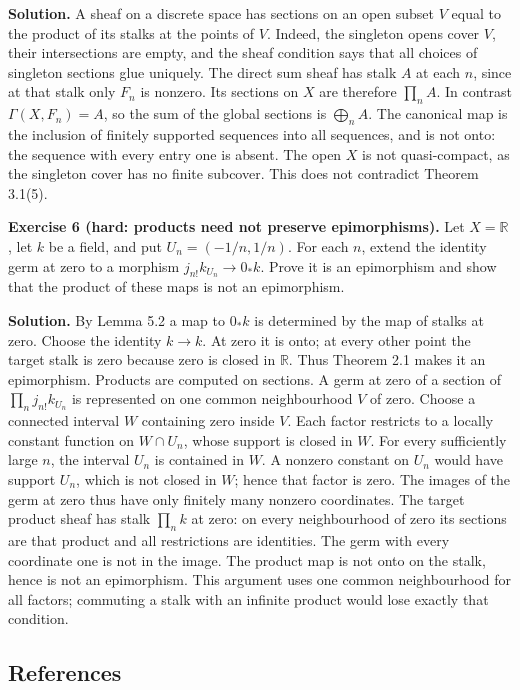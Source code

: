 \documentclass[
  english,
  11pt,
  a4paper,
]{article}
\begin{document}
\textbf{Solution.} A sheaf on a discrete space has sections on an open
subset \(V\) equal to the product of its stalks at the points of \(V\).
Indeed, the singleton opens cover \(V\), their intersections are empty,
and the sheaf condition says that all choices of singleton sections glue
uniquely. The direct sum sheaf has stalk \(A\) at each \(n\), since at
that stalk only \(F_n\) is nonzero. Its sections on \(X\) are therefore
\(\prod_nA\). In contrast \(\Gamma(X,F_n)=A\), so the sum of the global
sections is \(\bigoplus_nA\). The canonical map is the inclusion of
finitely supported sequences into all sequences, and is not onto: the
sequence with every entry one is absent. The open \(X\) is not
quasi-compact, as the singleton cover has no finite subcover. This does
not contradict Theorem 3.1(5).

\textbf{Exercise 6 (hard: products need not preserve epimorphisms).} Let
\(X=\mathbb R\), let \(k\) be a field, and put \(U_n=(-1/n,1/n)\). For
each \(n\), extend the identity germ at zero to a morphism
\(j_{n!}k_{U_n}\to0_*k\). Prove it is an epimorphism and show that the
product of these maps is not an epimorphism.

\textbf{Solution.} By Lemma 5.2 a map to \(0_*k\) is determined by the
map of stalks at zero. Choose the identity \(k\to k\). At zero it is
onto; at every other point the target stalk is zero because zero is
closed in \(\mathbb R\). Thus Theorem 2.1 makes it an epimorphism.
Products are computed on sections. A germ at zero of a section of
\(\prod_nj_{n!}k_{U_n}\) is represented on one common neighbourhood
\(V\) of zero. Choose a connected interval \(W\) containing zero inside
\(V\). Each factor restricts to a locally constant function on
\(W\cap U_n\), whose support is closed in \(W\). For every sufficiently
large \(n\), the interval \(U_n\) is contained in \(W\). A nonzero
constant on \(U_n\) would have support \(U_n\), which is not closed in
\(W\); hence that factor is zero. The images of the germ at zero thus
have only finitely many nonzero coordinates. The target product sheaf
has stalk \(\prod_nk\) at zero: on every neighbourhood of zero its
sections are that product and all restrictions are identities. The germ
with every coordinate one is not in the image. The product map is not
onto on the stalk, hence is not an epimorphism. This argument uses one
common neighbourhood for all factors; commuting a stalk with an infinite
product would lose exactly that condition.

\subsection{References}\label{sheaves-of-modules-on-a-ringed-space--references}
\end{document}
